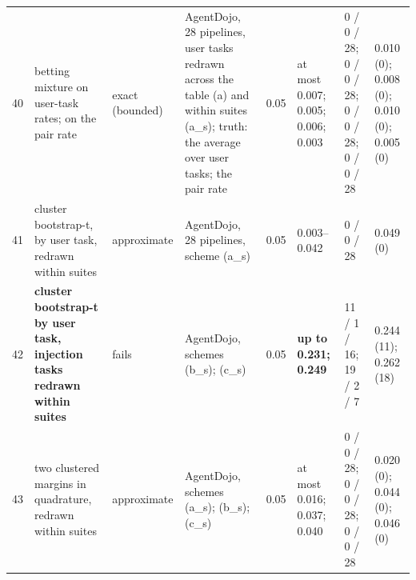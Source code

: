 \begin{tabular}{@{}r p{2.8cm} p{2.0cm} p{3.9cm} l p{2.1cm} p{2.0cm} p{1.9cm}@{}}
40 & betting mixture on user-task rates; on the pair rate & exact (bounded) & AgentDojo, 28 pipelines, user tasks redrawn across the table (a) and within suites (a\_s); truth: the average over user tasks; the pair rate & 0.05 & at most 0.007; 0.005; 0.006; 0.003 & 0 / 0 / 28; 0 / 0 / 28; 0 / 0 / 28; 0 / 0 / 28 & 0.010 (0); 0.008 (0); 0.010 (0); 0.005 (0) \\
41 & cluster bootstrap-t, by user task, redrawn within suites & approximate & AgentDojo, 28 pipelines, scheme (a\_s) & 0.05 & 0.003--0.042 & 0 / 0 / 28 & 0.049 (0) \\
42 & \textbf{cluster bootstrap-t by user task, injection tasks redrawn within suites} & fails & AgentDojo, schemes (b\_s); (c\_s) & 0.05 & \textbf{up to 0.231; 0.249} & 11 / 1 / 16; 19 / 2 / 7 & 0.244 (11); 0.262 (18) \\
43 & two clustered margins in quadrature, redrawn within suites & approximate & AgentDojo, schemes (a\_s); (b\_s); (c\_s) & 0.05 & at most 0.016; 0.037; 0.040 & 0 / 0 / 28; 0 / 0 / 28; 0 / 0 / 28 & 0.020 (0); 0.044 (0); 0.046 (0) \\
\bottomrule
\end{tabular}
